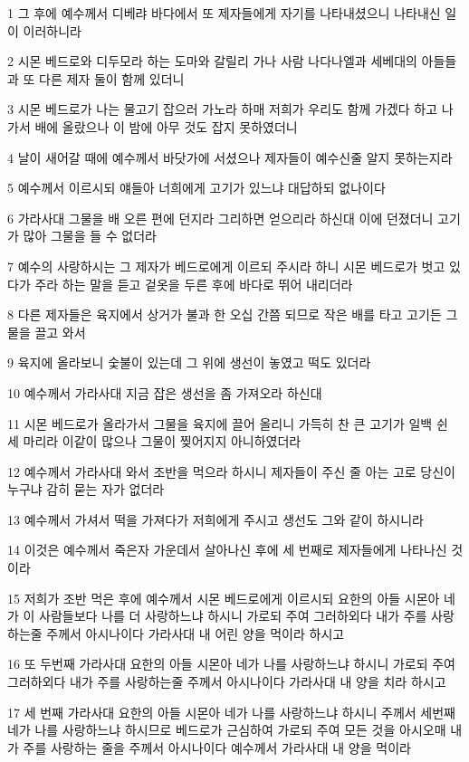 \par 1 그 후에 예수께서 디베랴 바다에서 또 제자들에게 자기를 나타내셨으니 나타내신 일이 이러하니라
\par 2 시몬 베드로와 디두모라 하는 도마와 갈릴리 가나 사람 나다나엘과 세베대의 아들들과 또 다른 제자 둘이 함께 있더니
\par 3 시몬 베드로가 나는 물고기 잡으러 가노라 하매 저희가 우리도 함께 가겠다 하고 나가서 배에 올랐으나 이 밤에 아무 것도 잡지 못하였더니
\par 4 날이 새어갈 때에 예수께서 바닷가에 서셨으나 제자들이 예수신줄 알지 못하는지라
\par 5 예수께서 이르시되 얘들아 너희에게 고기가 있느냐 대답하되 없나이다
\par 6 가라사대 그물을 배 오른 편에 던지라 그리하면 얻으리라 하신대 이에 던졌더니 고기가 많아 그물을 들 수 없더라
\par 7 예수의 사랑하시는 그 제자가 베드로에게 이르되 주시라 하니 시몬 베드로가 벗고 있다가 주라 하는 말을 듣고 겉옷을 두른 후에 바다로 뛰어 내리더라
\par 8 다른 제자들은 육지에서 상거가 불과 한 오십 간쯤 되므로 작은 배를 타고 고기든 그물을 끌고 와서
\par 9 육지에 올라보니 숯불이 있는데 그 위에 생선이 놓였고 떡도 있더라
\par 10 예수께서 가라사대 지금 잡은 생선을 좀 가져오라 하신대
\par 11 시몬 베드로가 올라가서 그물을 육지에 끌어 올리니 가득히 찬 큰 고기가 일백 쉰 세 마리라 이같이 많으나 그물이 찢어지지 아니하였더라
\par 12 예수께서 가라사대 와서 조반을 먹으라 하시니 제자들이 주신 줄 아는 고로 당신이 누구냐 감히 묻는 자가 없더라
\par 13 예수께서 가셔서 떡을 가져다가 저희에게 주시고 생선도 그와 같이 하시니라
\par 14 이것은 예수께서 죽은자 가운데서 살아나신 후에 세 번째로 제자들에게 나타나신 것이라
\par 15 저희가 조반 먹은 후에 예수께서 시몬 베드로에게 이르시되 요한의 아들 시몬아 네가 이 사람들보다 나를 더 사랑하느냐 하시니 가로되 주여 그러하외다 내가 주를 사랑하는줄 주께서 아시나이다 가라사대 내 어린 양을 먹이라 하시고
\par 16 또 두번째 가라사대 요한의 아들 시몬아 네가 나를 사랑하느냐 하시니 가로되 주여 그러하외다 내가 주를 사랑하는줄 주께서 아시나이다 가라사대 내 양을 치라 하시고
\par 17 세 번째 가라사대 요한의 아들 시몬아 네가 나를 사랑하느냐 하시니 주께서 세번째 네가 나를 사랑하느냐 하시므로 베드로가 근심하여 가로되 주여 모든 것을 아시오매 내가 주를 사랑하는 줄을 주께서 아시나이다 예수께서 가라사대 내 양을 먹이라
